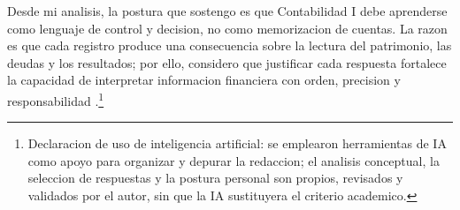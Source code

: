 \documentclass[
	spanish,
	letterpaper, oneside
]{article}
\begin{document}
Desde mi analisis, la postura que sostengo es que Contabilidad I debe aprenderse como lenguaje de control y decision, no como memorizacion de cuentas. La razon es que cada registro produce una consecuencia sobre la lectura del patrimonio, las deudas y los resultados; por ello, considero que justificar cada respuesta fortalece la capacidad de interpretar informacion financiera con orden, precision y responsabilidad \citep{cinifNif2025,imcpNif2024}.\footnote{Declaracion de uso de inteligencia artificial: se emplearon herramientas de IA como apoyo para organizar y depurar la redaccion; el analisis conceptual, la seleccion de respuestas y la postura personal son propios, revisados y validados por el autor, sin que la IA sustituyera el criterio academico.}

\clearpage

\end{document}
